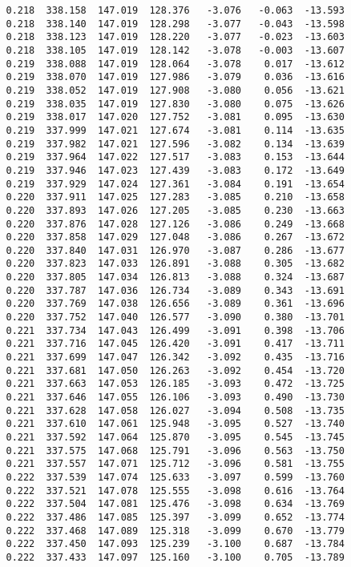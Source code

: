 \begin{verbatim}
   0.218  338.158  147.019  128.376   -3.076   -0.063  -13.593
   0.218  338.140  147.019  128.298   -3.077   -0.043  -13.598
   0.218  338.123  147.019  128.220   -3.077   -0.023  -13.603
   0.218  338.105  147.019  128.142   -3.078   -0.003  -13.607
   0.219  338.088  147.019  128.064   -3.078    0.017  -13.612
   0.219  338.070  147.019  127.986   -3.079    0.036  -13.616
   0.219  338.052  147.019  127.908   -3.080    0.056  -13.621
   0.219  338.035  147.019  127.830   -3.080    0.075  -13.626
   0.219  338.017  147.020  127.752   -3.081    0.095  -13.630
   0.219  337.999  147.021  127.674   -3.081    0.114  -13.635
   0.219  337.982  147.021  127.596   -3.082    0.134  -13.639
   0.219  337.964  147.022  127.517   -3.083    0.153  -13.644
   0.219  337.946  147.023  127.439   -3.083    0.172  -13.649
   0.219  337.929  147.024  127.361   -3.084    0.191  -13.654
   0.220  337.911  147.025  127.283   -3.085    0.210  -13.658
   0.220  337.893  147.026  127.205   -3.085    0.230  -13.663
   0.220  337.876  147.028  127.126   -3.086    0.249  -13.668
   0.220  337.858  147.029  127.048   -3.086    0.267  -13.672
   0.220  337.840  147.031  126.970   -3.087    0.286  -13.677
   0.220  337.823  147.033  126.891   -3.088    0.305  -13.682
   0.220  337.805  147.034  126.813   -3.088    0.324  -13.687
   0.220  337.787  147.036  126.734   -3.089    0.343  -13.691
   0.220  337.769  147.038  126.656   -3.089    0.361  -13.696
   0.220  337.752  147.040  126.577   -3.090    0.380  -13.701
   0.221  337.734  147.043  126.499   -3.091    0.398  -13.706
   0.221  337.716  147.045  126.420   -3.091    0.417  -13.711
   0.221  337.699  147.047  126.342   -3.092    0.435  -13.716
   0.221  337.681  147.050  126.263   -3.092    0.454  -13.720
   0.221  337.663  147.053  126.185   -3.093    0.472  -13.725
   0.221  337.646  147.055  126.106   -3.093    0.490  -13.730
   0.221  337.628  147.058  126.027   -3.094    0.508  -13.735
   0.221  337.610  147.061  125.948   -3.095    0.527  -13.740
   0.221  337.592  147.064  125.870   -3.095    0.545  -13.745
   0.221  337.575  147.068  125.791   -3.096    0.563  -13.750
   0.221  337.557  147.071  125.712   -3.096    0.581  -13.755
   0.222  337.539  147.074  125.633   -3.097    0.599  -13.760
   0.222  337.521  147.078  125.555   -3.098    0.616  -13.764
   0.222  337.504  147.081  125.476   -3.098    0.634  -13.769
   0.222  337.486  147.085  125.397   -3.099    0.652  -13.774
   0.222  337.468  147.089  125.318   -3.099    0.670  -13.779
   0.222  337.450  147.093  125.239   -3.100    0.687  -13.784
   0.222  337.433  147.097  125.160   -3.100    0.705  -13.789

\end{verbatim}
